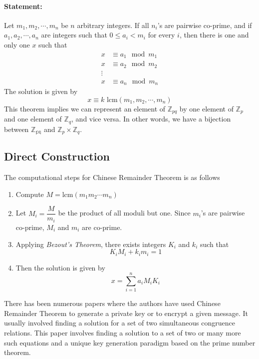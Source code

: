 \paragraph{Statement:} Let $m_1,m_2,\cdots,m_n$ be $n$ arbitrary integers. If all $n_i$'s are pairwise co-prime, and if $a_1,a_2,\cdots,a_n$ are integers such that $0\le a_i<m_i$ for every $i$, then there is one and only one $x$ such that
    \begin{align}
        x&\equiv a_1\mod m_1\\
        x&\equiv a_2\mod m_2\\
        \vdots\\
        x&\equiv a_n\mod m_n
    \end{align}
The solution is given by $$x\equiv k\text{ lcm}(m_1,m_2,\cdots,m_n)$$
This theorem implies we can represent an element of $\mathbb{Z}_{pq}$ by one element of $\mathbb{Z}_p$ and one element of $\mathbb{Z}_q$, and vice versa. In other words, we have a bijection between $\mathbb{Z_{pq}}$ and $\mathbb{Z}_p\times\mathbb{Z}_q$.

\subsection{Direct Construction}
The computational steps for Chinese Remainder Theorem is as follows
\begin{enumerate}
    \item Compute $M=\text{lcm}(m_1m_2\cdots m_n)$
    \item Let $M_i=\dfrac{M}{m_i}$ be the product of all moduli but one. Since $m_i$'s are pairwise co-prime, $M_i$ and $m_i$ are co-prime.
    \item Applying \textit{Bezout's Theorem}, there exists integers $K_i$ and $k_i$ such that $$K_iM_i+k_im_i=1$$
    \item Then the solution is given by $$x=\sum_{i=1}^na_iM_iK_i$$
\end{enumerate}
There has been numerous papers \cite{number_theory_the_chinese_remainder_theorem,dingyi1996chinese,douguet2012chinese,grossschadl2000chinese,wu2001rsa} where the authors have used Chinese Remainder Theorem to generate a private key or to encrypt a given message. It usually involved finding a solution for a set of two simultaneous congruence relations. This paper involves finding a solution to a set of two or many more such equations and a unique key generation paradigm based on the prime number theorem.
